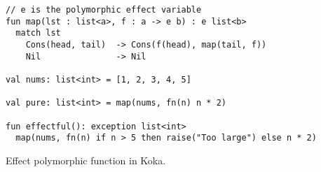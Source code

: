 \begin{algorithm}

\begin{verbatim}
// e is the polymorphic effect variable
fun map(lst : list<a>, f : a -> e b) : e list<b>
  match lst
    Cons(head, tail)  -> Cons(f(head), map(tail, f))
    Nil               -> Nil

val nums: list<int> = [1, 2, 3, 4, 5]

val pure: list<int> = map(nums, fn(n) n * 2)

fun effectful(): exception list<int>
  map(nums, fn(n) if n > 5 then raise("Too large") else n * 2)
\end{verbatim}

\caption{Effect polymorphic  function in Koka. \label{alg-eff:polymorphism-koka}}
\end{algorithm}